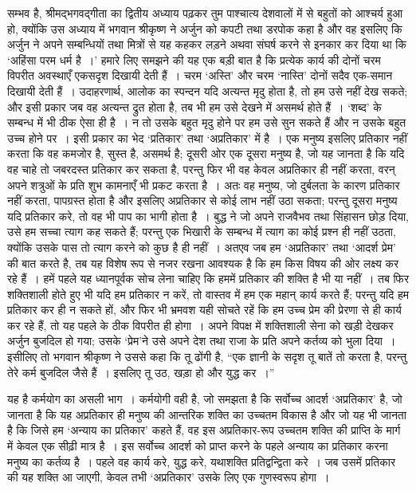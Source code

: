 सम्भव है, श्रीमद्भगवद्गीता का द्वितीय अध्याय पढ़कर तुम पाश्चात्य देशवालों में से बहुतों को आश्चर्य हुआ हो, क्योंकि उस अध्याय में भगवान श्रीकृष्ण ने अर्जुन को कपटी तथा डरपोक कहा है और वह इसलिए कि अर्जुन ने अपने सम्बन्धियों तथा मित्रों से यह कहकर लड़ने अथवा संघर्ष करने से इनकार कर दिया था कि ‘अहिंसा परम धर्म है~।’ हमारे लिए समझने की यह एक बड़ी बात है कि प्रत्येक कार्य की दोनों चरम विपरीत अवस्थाएँ एकसदृश दिखायी देती हैं~। चरम ‘अस्ति’ और चरम ‘नास्ति’ दोनों सदैव एक-समान दिखायी देती हैं~। उदाहरणार्थ, आलोक का स्पन्दन यदि अत्यन्त मृदु होता है, तो हम उसे नहीं देख सकते; और इसी प्रकार जब वह अत्यन्त द्रुत होता है, तब भी हम उसे देखने में असमर्थ होते हैं~। ‘शब्द’ के सम्बन्ध में भी ठीक ऐसा ही है~। न तो उसके बहुत मृदु होने पर हम उसे सुन सकते हैं और न उसके बहुत उच्च होने पर~। इसी प्रकार का भेद ‘प्रतिकार’ तथा ‘अप्रतिकार’ में है~। एक मनुष्य इसलिए प्रतिकार नहीं करता कि वह कमजोर है, सुस्त है, असमर्थ है; दूसरी ओर एक दूसरा मनुष्य है, जो यह जानता है कि यदि वह चाहे तो जबरदस्त प्रतिकार कर सकता है, परन्तु फिर भी वह केवल अप्रतिकार ही नहीं करता, वरन् अपने शत्रुओं के प्रति शुभ कामनाएँ भी प्रकट करता है~। अतः वह मनुष्य, जो दुर्बलता के कारण प्रतिकार नहीं करता, पापग्रस्त होता है और इसलिए अप्रतिकार से कोई लाभ नहीं उठा सकता; परन्तु दूसरा मनुष्य यदि प्रतिकार करे, तो वह भी पाप का भागी होता है~। बुद्ध ने जो अपने राजवैभव तथा सिंहासन छोड़ दिया, उसे हम सच्चा त्याग कह सकते हैं; परन्तु एक भिखारी के सम्बन्ध में त्याग का कोई प्रश्न ही नहीं उठता, क्योंकि उसके पास तो त्याग करने को कुछ है ही नहीं~। अतएव जब हम ‘अप्रतिकार’ तथा ‘आदर्श प्रेम’ की बात करते है, तब यह विशेष रूप से नजर रखना आवश्यक है कि हम किस विषय की ओर लक्ष्य कर रहे हैं~। हमें पहले यह ध्यानपूर्वक सोच लेना चाहिए कि हममें प्रतिकार की शक्ति है भी या नहीं~। तब फिर शक्तिशाली होते हुए भी यदि हम प्रतिकार न करें, तो वास्तव में हम एक महान् कार्य करते हैं; परन्तु यदि हम प्रतिकार कर ही न सकते हों, और फिर भी भ्रमवश यही सोचते रहें कि हम उच्च प्रेम की प्रेरणा से ही कार्य कर रहे हैं, तो यह पहले के ठीक विपरीत ही होगा~। अपने विपक्ष में शक्तिशाली सेना को खड़ी देखकर अर्जुन बुजदिल हो गया; उसके ‘प्रेम’ने उसे अपने देश तथा राजा के प्रति अपने कर्तव्य को भुला दिया~। इसीलिए तो भगवान श्रीकृष्ण ने उससे कहा कि तू ढोंगी है, “एक ज्ञानी के सदृश तू बातें तो करता है, परन्तु तेरे कर्म बुजदिल जैसे हैं~। इसलिए तू उठ, खड़ा हो और युद्ध कर~।”

यह है कर्मयोग का असली भाग~। कर्मयोगी वही है, जो समझता है कि सर्वोच्च आदर्श ‘अप्रतिकार’ है, जो जानता है कि यह अप्रतिकार ही मनुष्य की आन्तरिक शक्ति का उच्चतम विकास है और जो यह भी जानता है कि जिसे हम ‘अन्याय का प्रतिकार’ कहते हैं, वह इस अप्रतिकार-रूप उच्चतम शक्ति की प्राप्ति के मार्ग में केवल एक सीढ़ी मात्र है~। इस सर्वोच्च आदर्श को प्राप्त करने के पहले अन्याय का प्रतिकार करना मनुष्य का कर्तव्य है~। पहले वह कार्य करे, युद्ध करे, यथाशक्ति प्रतिद्वन्द्विता करे~। जब उसमें प्रतिकार की यह शक्ति आ जाएगी, केवल तभी ‘अप्रतिकार’ उसके लिए एक गुणस्वरूप होगा~।

